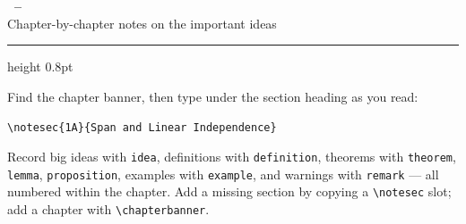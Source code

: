 \begin{center}
  {\Large\sffamily\bfseries\color{navy}\coursename\ -- \courselongname}\\[3pt]
  {\sffamily\color{muted} Chapter-by-chapter notes on the important ideas}\\[3pt]
  {\small\sffamily\color{muted}\textbookname\quad\textbullet\quad \term\quad\textbullet\quad \studentname}
\end{center}
\medskip
{\color{rule}\hrule height 0.8pt}
\bigskip

{\small
\begin{tcolorbox}[colback=paperblue, colframe=rule, boxrule=0.4pt, arc=2pt,
  left=7pt, right=7pt, top=5pt, bottom=5pt,
  title={\sffamily\bfseries\color{navy} Taking notes},
  colbacktitle=paperblue]
\sffamily Find the chapter banner, then type under the section heading as you read:
\begin{center}
\texttt{\textbackslash notesec\{1A\}\{Span and Linear Independence\}}
\end{center}
Record big ideas with \texttt{idea}, definitions with \texttt{definition}, theorems with
\texttt{theorem}, \texttt{lemma}, \texttt{proposition}, examples with \texttt{example}, and
warnings with \texttt{remark} --- all numbered within the chapter.
Add a missing section by copying a \texttt{\textbackslash notesec} slot;
add a chapter with \texttt{\textbackslash chapterbanner}.
\end{tcolorbox}
}

\medskip
\tableofcontents







